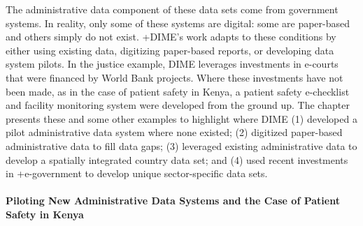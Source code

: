 \documentclass[
]{WileySix}
\begin{document}
The administrative data component of these data sets come from government systems. In reality, only some of these systems are digital: some are paper-based and others simply do not exist. +DIME\textbar's work adapts to these conditions by either using existing data, digitizing paper-based reports, or developing data system pilots. In the justice example, DIME leverages investments in e-courts that were financed by World Bank projects. Where these investments have not been made, as in the case of patient safety in Kenya, a patient safety e-checklist and facility monitoring system were developed from the ground up. The chapter presents these and some other examples to highlight where DIME (1) developed a pilot administrative data system where none existed; (2) digitized paper-based administrative data to fill data gaps; (3) leveraged existing administrative data to develop a spatially integrated country data set; and (4) used recent investments in +e-government\textbar{} to develop unique sector-specific data sets.

\hypertarget{piloting-new-administrative-data-systems-and-the-case-of-patient-safety-in-kenya}{%
\paragraph{Piloting New Administrative Data Systems and the Case of Patient Safety in Kenya}\label{piloting-new-administrative-data-systems-and-the-case-of-patient-safety-in-kenya}}
\end{document}

